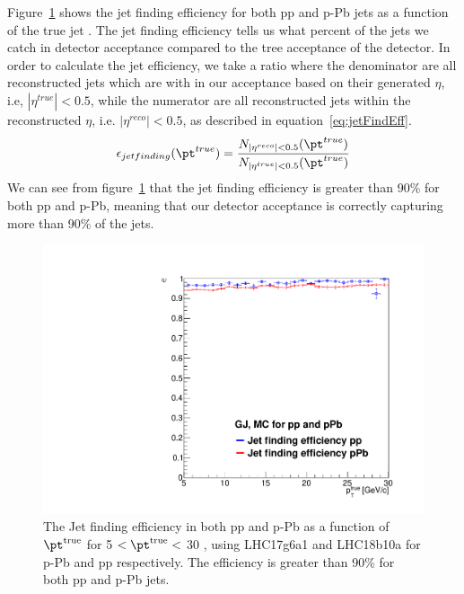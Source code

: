 Figure~\ref{fig:jetfindingEff} shows the jet finding efficiency for both pp and p-Pb jets as a function of the true jet \pt. The jet finding efficiency tells us what percent of the jets we catch in detector acceptance compared to the tree acceptance of the detector. In order to calculate the jet efficiency, we take a ratio where the denominator are all reconstructed jets which are with in our acceptance based on their generated $\eta$, i.e, $|\eta^{true}| < 0.5$, while the numerator are all reconstructed jets within the reconstructed $\eta$, i.e. $|\eta^{reco}| < 0.5$, as described in equation~\ref{eq:jetFindEff}.
\begin{equation}\label{eq:jetFindEff}
\epsilon_{jet finding}(\pt^{true}) = \frac{N_{|\eta^{reco}| < 0.5}(\pt^{true})}{N_{|\eta^{true}| < 0.5}(\pt^{true})}
\end{equation}
We can see from figure~\ref{fig:jetfindingEff} that the jet finding efficiency is greater than 90\% for both pp and p-Pb, meaning that our detector acceptance is correctly capturing more than 90\% of the jets. 
\begin{figure}[h]
\center
\includegraphics[width=.495\textwidth]{JetResponse/jet_findEff_its.pdf}
\caption{The Jet finding efficiency in both pp and p-Pb as a function of $\pt^{\mathrm{true}}$ for 5 \GeVc $<\pt^{\mathrm{true}}<$ 30 \GeVc, using LHC17g6a1 and LHC18b10a for p-Pb and pp respectively. The efficiency is greater than 90\% for both pp and p-Pb jets.}
\label{fig:jetfindingEff}
\end{figure}












